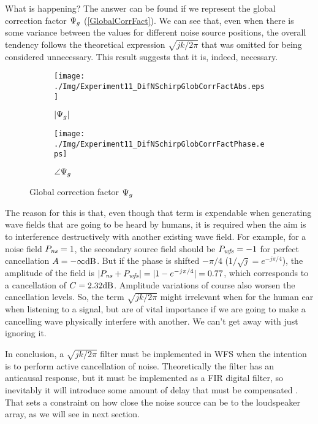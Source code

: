 What is happening? The answer can be found if we represent the global correction factor $\globalCorrectionFactor$ (\autoref{GlobalCorrFact}). We can see that, even when there is some variance between the values for different noise source positions, the overall tendency follows the theoretical expression $\sqrt{jk/2\pi}$ that was omitted for being considered unnecessary. This result suggests that it is, indeed, necessary.

\begin{figure}[h]
	\begin{subfigure}[b]{0.49\textwidth}
		\centering
		\texttt{[image: ./Img/Experiment11\_DifNSchirpGlobCorrFactAbs.eps]}
		\caption{$|\globalCorrectionFactor|$}
		\label{GlobalCorrFactAbs}
	\end{subfigure}
	\begin{subfigure}[b]{0.49\textwidth}
		\centering
		\texttt{[image: ./Img/Experiment11\_DifNSchirpGlobCorrFactPhase.eps]}
		\caption{$\angle{\globalCorrectionFactor}$}
		\label{GlobalCorrFactPhase}
	\end{subfigure}
\caption{Global correction factor $\globalCorrectionFactor$}
\label{GlobalCorrFact}
\end{figure}

The reason for this is that, even though that term is expendable when generating wave fields that are going to be heard by humans, it is required when the aim is to interference destructively with another existing wave field. For example, for a noise field $\Field[ns][frequency] = 1$, the secondary source field should be $\Field[wfs][frequency] = -1$ for perfect cancellation $\attenuation = -\infty \si{dB}$. But if the phase is shifted $-\pi/4$ ($1/\sqrt{j} = e^{-j\pi/4}$), the amplitude of the field is $|\Field[ns][frequency] + \Field[wfs][frequency]| = |1 - e^{-j\pi/4}| = 0.77$, which corresponds to a cancellation of $\cancellation = 2.32\si{dB}$. Amplitude variations of course also worsen the cancellation levels. So, the term $\sqrt{jk/2\pi}$ might irrelevant when for the human ear when listening to a signal, but are of vital importance if we are going to make a cancelling wave physically interfere with another. We can't get away with just ignoring it.

In conclusion, a $\sqrt{jk/2\pi}$ filter must be implemented in WFS when the intention is to perform active cancellation of noise. Theoretically the filter has an anticausal response, but it must be implemented as a FIR digital filter, so inevitably it will introduce some amount of delay that must be compensated \cite{Lapini2018}. That sets a constraint on how close the noise source can be to the loudspeaker array, as we will see in next section.

